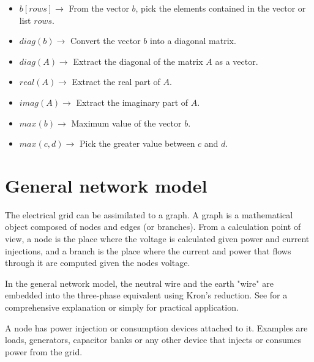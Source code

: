 \documentclass[a4paper,twoside]{tufte-book}
\begin{document}
\begin{fullwidth}
\begin{multicols}{2}
\begin{itemize}
	
	\item $b[rows] \rightarrow$ From the vector $b$, pick the elements contained in the vector or list $rows$.
	
	\item $diag(b) \rightarrow$ Convert the vector $b$ into a diagonal matrix. 
	
	\item $diag(A) \rightarrow$ Extract the diagonal of the matrix $A$ as a vector. 
	
	\item $real(A) \rightarrow$ Extract the real part of $A$.
	
	\item $imag(A) \rightarrow$ Extract the imaginary part of $A$.
	
	\item $max(b) \rightarrow$ Maximum value of the vector $b$.
	
	\item $max(c, d) \rightarrow$ Pick the greater value between $c$ and $d$.
\end{itemize}

\end{multicols}

\end{fullwidth}

\chapter{General network model}

The electrical grid can be assimilated to a graph. A graph is a mathematical object composed of nodes and edges (or branches). From a calculation point of view, a node is the place where the voltage is calculated given power and current injections, and a branch is the place where the current and power that flows through it are computed given the nodes voltage.

In the general network model, the neutral wire and the earth "wire" are embedded into the three-phase equivalent using Kron's reduction. See \cite{dorfler2013kron} for a comprehensive explanation or simply \cite{kersting2012distribution} for practical application.

A node has power injection or consumption devices attached to it. Examples are loads, generators, capacitor banks or any other device that injects or consumes power from the grid.
\end{document}
